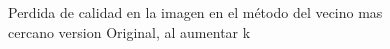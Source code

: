 \documentclass[a4paper]{article}
\begin{document}
\begin{figure}[H]
\begin{center}

\end{center}
\caption{Perdida de calidad en la imagen en el método del vecino mas cercano version Original,  al aumentar k }
\label{calidadPalabras}
\end{figure}
\end{document}
